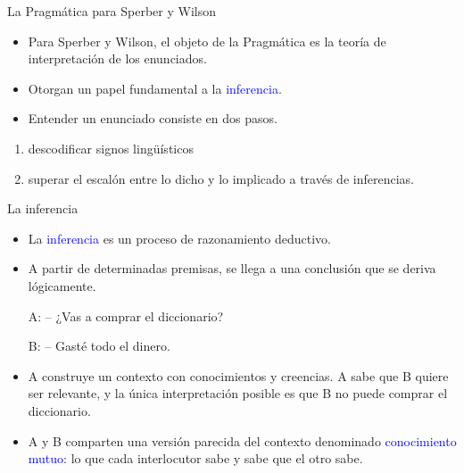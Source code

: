 \documentclass{beamer}
\begin{document}
\begin{frame}{La Pragmática para Sperber y Wilson}

	\begin{itemize}
		\item Para Sperber y Wilson, el objeto de la Pragmática es la teoría de interpretación de los enunciados.
		\item Otorgan un papel fundamental a la \textcolor{blue}{inferencia}.
		\item Entender un enunciado consiste en dos pasos.
	\end{itemize}
	\begin{enumerate}
		\item descodificar signos lingüísticos
		\item superar el escalón entre lo dicho y lo implicado a través de inferencias.
	\end{enumerate}

\end{frame}

\begin{frame}{La inferencia}

	\begin{itemize}
		\item La \textcolor{blue}{inferencia} es un proceso de razonamiento deductivo.
		\item A partir de determinadas premisas, se llega a una conclusión que se deriva lógicamente.
		
		\vspace{0.3cm}
		A: -- ¿Vas a comprar el diccionario?
		
		B: -- Gasté todo el dinero.
		\vspace{0.3cm}
		
		\item A construye un contexto con conocimientos y creencias. A sabe que B quiere ser relevante, y la única interpretación posible es que B no puede comprar el diccionario.
		\item A y B comparten una versión parecida del contexto denominado \textcolor{blue}{conocimiento mutuo}: lo que cada interlocutor sabe y sabe que el otro sabe.
	\end{itemize}

\end{frame}
\end{document}
